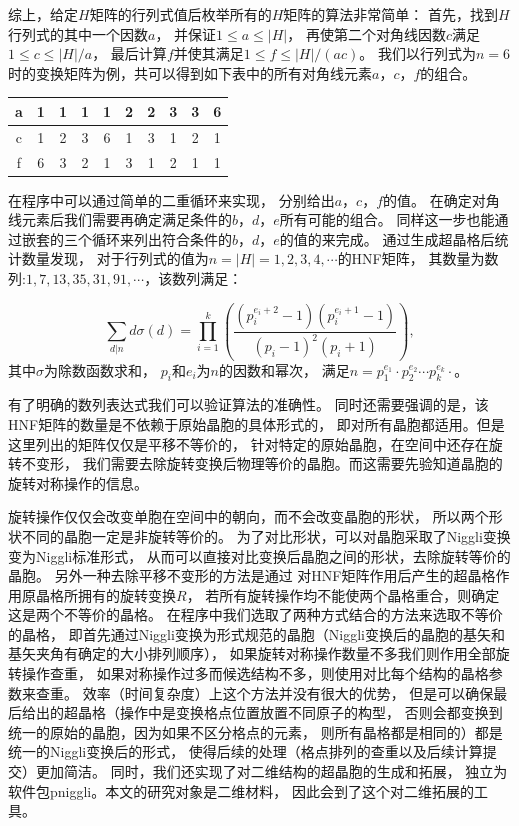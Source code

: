 综上，给定$H$矩阵的行列式值后枚举所有的$H$矩阵的算法非常简单：
首先，找到$H$行列式的其中一个因数$a$，
并保证$1\leq a \leq |H|$，
再使第二个对角线因数$c$满足$1\leq c\leq |H|/a$，
最后计算$f$并使其满足$1\leq f\leq |H|/(ac)$。
我们以行列式为$n=6$时的变换矩阵为例，共可以得到如下表中的所有对角线元素$a$，$c$，$f$的组合。

\begin{table}
  \centering
  \begin{tabular}{c|ccccccccc}
    a & 1 & 1 & 1 & 1 & 2 & 2 & 3 & 3 & 6 \\
    \hline
    c & 1 & 2 & 3 & 6 & 1 & 3 & 1 & 2 & 1 \\
    \hline
    f & 6 & 3 & 2 & 1 & 3 & 1 & 2 & 1 & 1 \\
  \end{tabular}
\end{table}

在程序中可以通过简单的二重循环来实现，
分别给出$a$，$c$，$f$的值。
在确定对角线元素后我们需要再确定满足条件的$b$，$d$，$e$所有可能的组合。
同样这一步也能通过嵌套的三个循环来列出符合条件的$b$，$d$，$e$的值的来完成。
通过生成超晶格后统计数量发现，
对于行列式的值为$n=|H|=1,2,3,4,\cdots$的HNF矩阵，
其数量为数列:$1,7,13,35,31,91,\cdots$，该数列满足：

\begin{equation}
  \sum_{d|n} d\sigma(d) = \prod^k_{i=1}\left( {\frac{(p_i^{e_i + 2}-1)(p_i^{e_i + 1}-1)}{(p_i-1)^2(p_i+1)}} \right),
\end{equation}
其中$\sigma$为除数函数求和\cite{erdiis1952distribution}，
$p_i$和$e_i$为$n$的因数和幂次，
满足$n=p_1^{e_1}\cdot p_2^{e_2}\cdots p_k^{e_k}\cdot$。

有了明确的数列表达式我们可以验证算法的准确性。
同时还需要强调的是，该HNF矩阵的数量是不依赖于原始晶胞的具体形式的，
即对所有晶胞都适用。但是这里列出的矩阵仅仅是平移不等价的，
针对特定的原始晶胞，在空间中还存在旋转不变形，
我们需要去除旋转变换后物理等价的晶胞。而这需要先验知道晶胞的旋转对称操作的信息。

旋转操作仅仅会改变单胞在空间中的朝向，而不会改变晶胞的形状，
所以两个形状不同的晶胞一定是非旋转等价的。
为了对比形状，可以对晶胞采取了Niggli变换\cite{kvrivy1976unified,grosse2004numerically}变为Niggli标准形式，
从而可以直接对比变换后晶胞之间的形状，去除旋转等价的晶胞。
另外一种去除平移不变形的方法\cite{hart2008algorithm}是通过
对HNF矩阵作用后产生的超晶格作用原晶格所拥有的旋转变换$R$，
若所有旋转操作均不能使两个晶格重合，则确定这是两个不等价的晶格。
在程序中我们选取了两种方式结合的方法来选取不等价的晶格，
即首先通过Niggli变换为形式规范的晶胞（Niggli变换后的晶胞的基矢和基矢夹角有确定的大小排列顺序），
如果旋转对称操作数量不多我们则作用全部旋转操作查重，
如果对称操作过多而候选结构不多，则使用对比每个结构的晶格参数来查重。
效率（时间复杂度）上这个方法并没有很大的优势，
但是可以确保最后给出的超晶格（操作中是变换格点位置放置不同原子的构型，
否则会都变换到统一的原始的晶胞，因为如果不区分格点的元素，
则所有晶格都是相同的）都是统一的Niggli变换后的形式，
使得后续的处理（格点排列的查重以及后续计算提交）更加简洁。
同时，我们还实现了对二维结构的超晶胞的生成和拓展，
独立为软件包pniggli\cite{pniggli}。本文的研究对象是二维材料，
因此会到了这个对二维拓展的工具。

